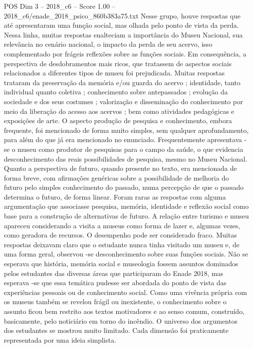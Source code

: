 \begin{textsample}{POS Dim 3 – 2018\_c6 – Score 1.00 – 2018\_c6/enade\_2018\_psico\_860b383a75.txt}
Nesse grupo, houve respostas que até apresentaram uma função social, mas olhada pelo ponto de vista da perda.
Nessa linha, muitas respostas enalteciam a importância do Museu Nacional, sua relevância no cenário nacional, o impacto da perda de seu acervo, isso complementado por frágeis reflexões sobre as funções sociais.
Em consequência, a perspectiva de desdobramentos mais ricos, que tratassem de aspectos sociais relacionados a diferentes tipos de museu foi prejudicada.
Muitas respostas trataram da preservação da memória e/ou guarda do acervo ; identidade, tanto individual quanto coletiva ; conhecimento sobre antepassados ; evolução da sociedade e dos seus costumes ; valorização e disseminação do conhecimento por meio da liberação do acesso aos acervos ; bem como atividades pedagógicas e exposições de arte.
O aspecto produção de pesquisa e conhecimento, embora frequente, foi mencionado de forma muito simples, sem qualquer aprofundamento, para além do que já era mencionado no enunciado.
Frequentemente apresentava -se o museu como produtor de pesquisas para o campo da saúde, o que evidencia desconhecimento das reais possibilidades de pesquisa, mesmo no Museu Nacional.
Quanto a perspectiva de futuro, quando presente no texto, era mencionada de forma breve, com afirmações genéricas sobre a possibilidade de melhoria do futuro pelo simples conhecimento do passado, numa percepção de que o passado determina o futuro, de forma linear.
Foram raras as respostas com alguma argumentação que associasse pesquisa, memória, identidade e reflexão social como base para a construção de alternativas de futuro.
A relação entre turismo e museu apareceu considerando a visita a museus como forma de lazer e, algumas vezes, como geradora de recursos.
O desempenho pode ser considerado fraco.
Muitas respostas deixavam claro que o estudante nunca tinha visitado um museu e, de uma forma geral, observou -se desconhecimento sobre suas funções sociais.
Não se esperava que história, memória social e museologia fossem assuntos dominados pelos estudantes das diversas áreas que participaram do Enade 2018, mas esperava -se que essa temática pudesse ser abordada do ponto de vista das experiências pessoais ou de conhecimento social.
Como uma vivência própria com os museus também se revelou frágil ou inexistente, o conhecimento sobre o assunto ficou bem restrito aos textos motivadores e ao senso comum, construído, basicamente, pelo noticiário em torno do incêndio.
O universo dos argumentos dos estudantes se mostrou muito limitado.
Cada dimensão foi praticamente representada por uma ideia simplista.

\end{textsample}
